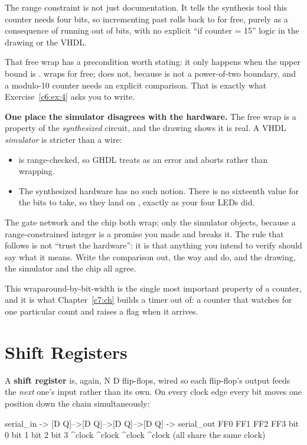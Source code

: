 The range constraint  is not just documentation. It tells the synthesis tool this
counter needs four bits, so incrementing past  rolls back to  for free, purely as a
consequence of running out of bits, with no explicit ``if counter = 15'' logic in the drawing or the
VHDL.

That free wrap has a precondition worth stating: it only happens when the upper bound is
.  wraps for free;  does not, because  is not a
power-of-two boundary, and a modulo-10 counter needs an explicit comparison. That is exactly what
Exercise~\ref{c6:ex:4} asks you to write.

\textbf{One place the simulator disagrees with the hardware.} The free wrap is a property of the
\emph{synthesized} circuit, and the drawing shows it is real. A VHDL \emph{simulator} is stricter
than a wire:
\begin{itemize}
  \item {} is range-checked, so GHDL treats  as an
    error and aborts rather than wrapping.
  \item The synthesized hardware has no such notion. There is no sixteenth value for the bits to
    take, so they land on , exactly as your four LEDs did.
\end{itemize}
The gate network and the chip both wrap; only the simulator objects, because a range-constrained
integer is a promise you made and  breaks it. The rule that follows is not ``trust the
hardware'': it is that anything you intend to verify should say what it means. Write the comparison
out, the way  and  do, and the drawing, the simulator and the
chip all agree.

This wraparound-by-bit-width is the single most important property of a counter, and it is what
Chapter~\ref{c7:ch} builds a timer out of: a counter that watches for one particular count and
raises a flag when it arrives.

\section{Shift Registers}
\label{c6:a2}
A \textbf{shift register} is, again, N D flip-flops, wired so each flip-flop's output feeds the
\emph{next} one's input rather than its own. On every clock edge every bit moves one position down
the chain simultaneously:

\begin{console}
serial_in -> [D Q]-->[D Q]-->[D Q]-->[D Q] -> serial_out
              FF0     FF1     FF2     FF3
             bit 0   bit 1   bit 2   bit 3
               ^clock  ^clock  ^clock  ^clock  (all share the same clock)
\end{console}

